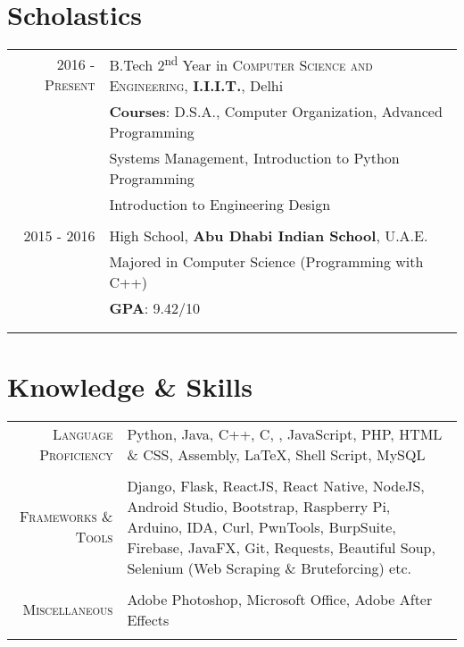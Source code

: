 \documentclass[a4paper,10pt]{article}
\begin{document}
\section{Scholastics}
\begin{tabular}{r|p{13.5cm}}
 \textsc{2016 - Present} & B.Tech 2\textsuperscript{nd} Year in \textsc{Computer Science and Engineering}, \textbf{I.I.I.T.}, Delhi\\
& \textbf{Courses}: D.S.A., Computer Organization, Advanced Programming\\
& Systems Management, Introduction to Python Programming\\
& Introduction to Engineering Design\\\multicolumn{1}{c}{}\\
\textsc{2015 - 2016}& High School, \normalsize\textbf{Abu Dhabi Indian School}, U.A.E.\\
& Majored in Computer Science (Programming with C++) \\
&\normalsize \textbf{GPA}: 9.42/10\\&\\\multicolumn{1}{c}{}\\
\end{tabular}

\section{Knowledge \& Skills}
\begin{tabular}{r|p{11cm}}
 \textsc{Language Proficiency} & Python, Java, C++, C, , JavaScript, PHP, HTML \& CSS, Assembly, LaTeX, Shell Script, MySQL\\\multicolumn{1}{c}{}\\
 \textsc{Frameworks \& Tools} & Django, Flask, ReactJS, React Native, NodeJS, Android Studio, Bootstrap, Raspberry Pi, Arduino, IDA, Curl, PwnTools, BurpSuite, Firebase, JavaFX, Git, Requests, Beautiful Soup, Selenium (Web Scraping \& Bruteforcing) etc.\\\multicolumn{1}{c}{}\\
 \textsc{Miscellaneous} & Adobe Photoshop, Microsoft Office, Adobe After Effects\\\multicolumn{1}{c}{}
\end{tabular}


\end{document}
